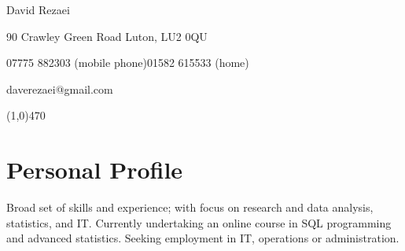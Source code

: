 \documentclass[11pt]{article} %
\begin{document}


\centerline{{\Huge \sc David Rezaei}}  %
\centerline{90 Crawley Green Road \textbullet \hspace{5pt}Luton, LU2 0QU \textbullet \hspace{5pt}}
\centerline{07775 882303 (mobile phone)\hspace{5pt}\textbullet \hspace{5pt}01582 615533 (home)}
\centerline{daverezaei@gmail.com}
\noindent
\line(1,0){470}\\

\section*{Personal Profile}
Broad set of skills and experience; with focus on research and data analysis, statistics, and IT. Currently 
undertaking an online course in SQL programming and advanced statistics. Seeking employment in IT, operations or administration.
\end{document}
